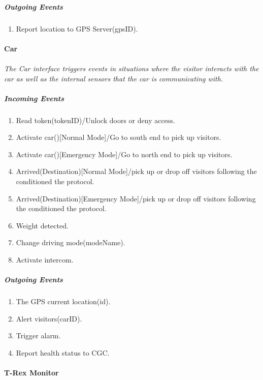 \documentclass[12pt]{article}
\begin{document}
	    \subparagraph{Outgoing Events}
		\begin{enumerate}
			\item Report location to GPS Server(gpsID).
		\end{enumerate}

	\paragraph{Car}
	\paragraph{} \textit{The Car interface triggers events in situations where the visitor interacts with the car as well as the internal sensors that the car is communicating with. }
	    \subparagraph{Incoming Events}
		\begin{enumerate}
            \item Read token(tokenID)/Unlock doors or deny access. 
            \item Activate car()[Normal Mode]/Go to south end to pick up visitors.
            \item Activate car()[Emergency Mode]/Go to north end to pick up visitors.
            \item Arrived(Destination)[Normal Mode]/pick up or drop off visitors following the conditioned the protocol.
            \item Arrived(Destination)[Emergency Mode]/pick up or drop off visitors following the conditioned the protocol.
            \item Weight detected.
            \item Change driving mode(modeName).
            \item Activate intercom.
		\end{enumerate}
				
	    \subparagraph{Outgoing Events}
		\begin{enumerate}
		    \item The GPS current location(id).
		    \item Alert visitors(carID).
		    \item Trigger alarm.
		    \item Report health status to CGC.
		\end{enumerate}

    \paragraph{T-Rex Monitor}
\end{document}
